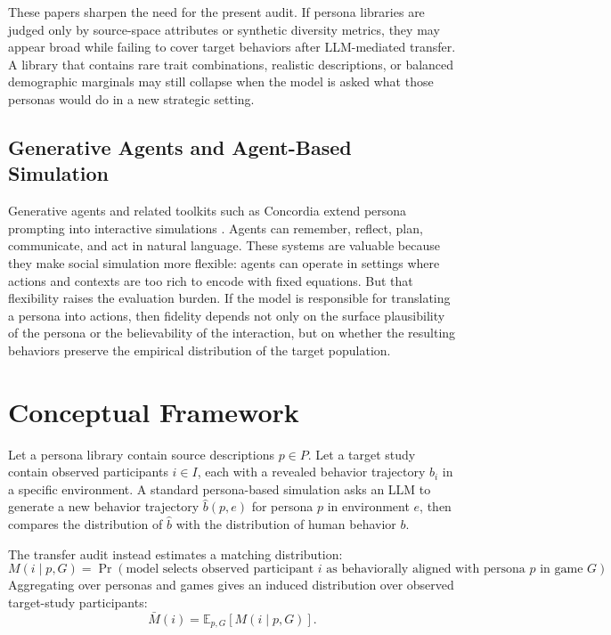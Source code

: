 \documentclass[11pt]{article}
\begin{document}
These papers sharpen the need for the present audit. If persona libraries are judged only by source-space attributes or synthetic diversity metrics, they may appear broad while failing to cover target behaviors after LLM-mediated transfer. A library that contains rare trait combinations, realistic descriptions, or balanced demographic marginals may still collapse when the model is asked what those personas would do in a new strategic setting.

\subsection{Generative Agents and Agent-Based Simulation}

Generative agents and related toolkits such as Concordia extend persona prompting into interactive simulations \citep{park2023generative,vezhnevets2023concordia}. Agents can remember, reflect, plan, communicate, and act in natural language. These systems are valuable because they make social simulation more flexible: agents can operate in settings where actions and contexts are too rich to encode with fixed equations. But that flexibility raises the evaluation burden. If the model is responsible for translating a persona into actions, then fidelity depends not only on the surface plausibility of the persona or the believability of the interaction, but on whether the resulting behaviors preserve the empirical distribution of the target population.

\section{Conceptual Framework}

Let a persona library contain source descriptions \(p \in P\). Let a target study contain observed participants \(i \in I\), each with a revealed behavior trajectory \(b_i\) in a specific environment. A standard persona-based simulation asks an LLM to generate a new behavior trajectory \(\hat{b}(p, e)\) for persona \(p\) in environment \(e\), then compares the distribution of \(\hat{b}\) with the distribution of human behavior \(b\).

The transfer audit instead estimates a matching distribution:
\[
M(i \mid p, G) = \Pr(\text{model selects observed participant } i \text{ as behaviorally aligned with persona } p \text{ in game } G).
\]
Aggregating over personas and games gives an induced distribution over observed target-study participants:
\[
\bar{M}(i) = \mathbb{E}_{p,G}[M(i \mid p,G)].
\]
\end{document}
